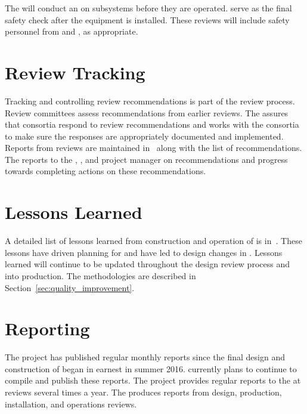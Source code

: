 The   will conduct an  on subsystems before they are operated.   serve as the final safety check after the 
equipment is installed. These reviews will include safety personnel from  and
, as appropriate. 

\section{Review Tracking}

Tracking and controlling review recommendations is part of the review
process. Review committees assess recommendations from earlier
reviews. The   assures that consortia respond to review
recommendations and works with the consortia to make sure the
responses are appropriately documented and implemented. Reports from
 reviews are maintained in~ along with the
list of recommendations. The   reports to the ,
, and  project manager on recommendations
and progress towards completing actions on these recommendations.


\section{Lessons Learned}
\label{sec:fdsp-coord-lessons}

A detailed list of lessons learned from construction and operation of
 is in~. These lessons have driven planning for
 and have led to design changes in . Lessons
learned will continue to be updated throughout the design review process
and into production. The methodologies are described in
Section~\ref{sec:quality_improvement}. %


\section{Reporting}
\label{sec:fdsp-coord-reporting}

The  project has published regular monthly reports since
the final design and construction of  began in
earnest in summer 2016.  currently plans to continue to compile and
publish these reports. The  project provides
regular reports to the  at reviews several times a
year. The    produces reports from design,
production, installation, and operations reviews.
